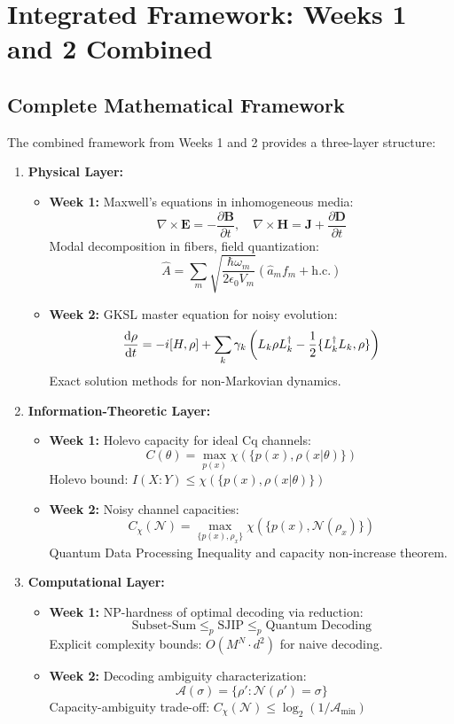 \documentclass[12pt,a4paper]{article}
\begin{document}
\section{Integrated Framework: Weeks 1 and 2 Combined}
\label{sec:integrated_framework}

\subsection{Complete Mathematical Framework}
The combined framework from Weeks 1 and 2 provides a three-layer structure:

\begin{enumerate}
    \item \textbf{Physical Layer:}
    \begin{itemize}
        \item \textbf{Week 1:} Maxwell's equations in inhomogeneous media:
        \[
        \nabla \times \mathbf{E} = -\frac{\partial\mathbf{B}}{\partial t}, \quad \nabla \times \mathbf{H} = \mathbf{J} + \frac{\partial\mathbf{D}}{\partial t}
        \]
        Modal decomposition in fibers, field quantization:
        \[
        \hat{A} = \sum_m \sqrt{\frac{\hbar\omega_m}{2\epsilon_0 V_m}} (\hat{a}_m f_m + \text{h.c.})
        \]
        \item \textbf{Week 2:} GKSL master equation for noisy evolution:
        \[
        \dv{\rho}{t} = -i[H,\rho] + \sum_k \gamma_k \left(L_k \rho L_k^\dagger - \frac{1}{2}\{L_k^\dagger L_k, \rho\}\right)
        \]
        Exact solution methods for non-Markovian dynamics.
    \end{itemize}
    
    \item \textbf{Information-Theoretic Layer:}
    \begin{itemize}
        \item \textbf{Week 1:} Holevo capacity for ideal Cq channels:
        \[
        C(\theta) = \max_{p(x)} \chi(\{p(x), \rho(x|\theta)\})
        \]
        Holevo bound: $I(X:Y) \leq \chi(\{p(x), \rho(x|\theta)\})$
        \item \textbf{Week 2:} Noisy channel capacities:
        \[
        C_\chi(\mathcal{N}) = \max_{\{p(x), \rho_x\}} \chi(\{p(x), \mathcal{N}(\rho_x)\})
        \]
        Quantum Data Processing Inequality and capacity non-increase theorem.
    \end{itemize}
    
    \item \textbf{Computational Layer:}
    \begin{itemize}
        \item \textbf{Week 1:} NP-hardness of optimal decoding via reduction:
        \[
        \text{Subset-Sum} \leq_p \text{SJIP} \leq_p \text{Quantum Decoding}
        \]
        Explicit complexity bounds: $O(M^N \cdot d^2)$ for naive decoding.
        \item \textbf{Week 2:} Decoding ambiguity characterization:
        \[
        \mathcal{A}(\sigma) = \{\rho' : \mathcal{N}(\rho') = \sigma\}
        \]
        Capacity-ambiguity trade-off: $C_\chi(\mathcal{N}) \leq \log_2(1/\mathcal{A}_{\min})$
    \end{itemize}
\end{enumerate}
\end{document}
